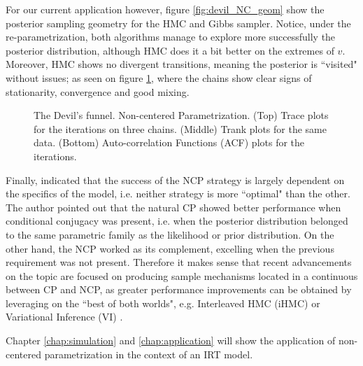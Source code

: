 For our current application however, figure \ref{fig:devil_NC_geom} show the posterior sampling geometry for the HMC and Gibbs sampler. Notice, under the re-parametrization, both algorithms manage to explore more successfully the posterior distribution, although HMC does it a bit better on the extremes of $v$. Moreover, HMC shows no divergent transitions, meaning the posterior is ``visited" without issues; as seen on figure \ref{fig:devil_NC}, where the chains show clear signs of stationarity, convergence and good mixing.

%
\begin{figure}[h]
	\centering
	\begin{subfigure}
		\texttt{[image: 3\_trace\_NC]}
	\end{subfigure}
	\begin{subfigure}
		\texttt{[image: 3\_trank\_NC]}
	\end{subfigure}
	\begin{subfigure}
		\texttt{[image: 3\_acf\_NC]}
	\end{subfigure}
	\caption[The Devil's funnel. Non-centered Parametrization.]%
	{The Devil's funnel. Non-centered Parametrization. (Top) Trace plots for the iterations on three chains. (Middle) Trank plots for the same data. (Bottom) Auto-correlation Functions (ACF) plots for the iterations.}
	\label{fig:devil_NC}
\end{figure}

Finally, \citet{Papaspiliopoulos_et_al_2007} indicated that the success of the NCP strategy is largely dependent on the specifics of the model, i.e. neither strategy is more ``optimal" than the other. The author pointed out that the natural CP showed better performance when conditional conjugacy was present, i.e. when the posterior distribution belonged to the same parametric family as the likelihood or prior distribution. On the other hand, the NCP worked as its complement, excelling when the previous requirement was not present. Therefore it makes sense that recent advancements on the topic are focused on producing sample mechanisms located in a continuous between CP and NCP, as greater performance improvements can be obtained by leveraging on the ``best of both worlds", e.g. Interleaved HMC (iHMC) or Variational Inference (VI) \cite{Gelfand_et_al_1995, Gelfand_et_al_1996, Papaspiliopoulos_et_al_2003, Papaspiliopoulos_et_al_2007, Gorinova_et_al_2019}.

Chapter \ref{chap:simulation} and \ref{chap:application} will show the application of non-centered parametrization in the context of an IRT model.
